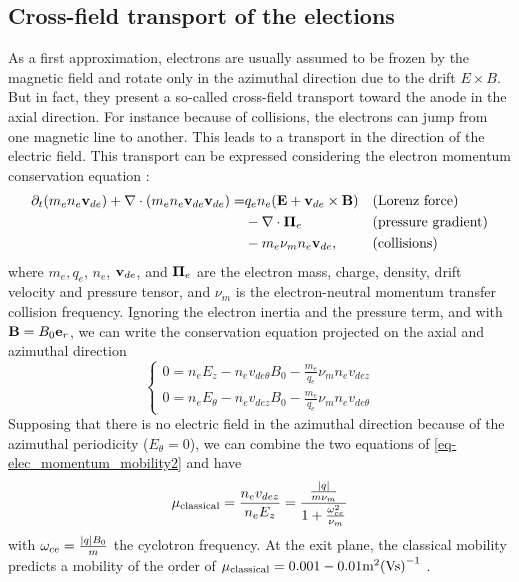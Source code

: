 \subsection*{Cross-field transport of the elections}
  \label{sec-mob}
  
  As a first approximation, electrons are usually assumed to be frozen by the magnetic field and rotate only in the azimuthal direction due to the drift $E \times B$.
  But in fact, they present a so-called cross-field transport toward the anode in the axial direction.
  For instance because of collisions, the electrons can jump from one magnetic line to another.
  This leads to a transport in the direction of the electric field.
  This transport can be expressed considering the electron momentum conservation equation \citep{lafleur2016a}\string:
  \begin{align*} %
    \partial_t(m_e n_e \vect{v}_{de}) + \div(m_e n_e  \vect{v}_{de} \vect{v}_{de})  = & q_e n_e ( \vect{E} + \vect{v}_{de} \times \vect{B})  &&\text{(Lorenz force)}\\ &- \div \vect{\Pi}_e &&\text{(pressure gradient)}\\ & - m_e \nu_m n_e \vect{v}_{de}, &&\text{(collisions)}
  \end{align*}
  where $m_e, q_e$, $n_e$, ${\mathbf v}_{de}$, and ${\mathbf \Pi}_e $ are the electron mass, charge, density, drift velocity and pressure tensor, and $\nu_m$ is the electron-neutral momentum transfer collision frequency.
  Ignoring the electron inertia and the pressure term, and with ${\mathbf B} = B_0 {\mathbf e}_r$, we can write the conservation equation projected on the axial and azimuthal direction
  \begin{equation} \label{eq-elec_momentum_mobility2}
  \begin{cases}
    0 =  n_e E_z - n_e v_{de{\theta}} B_0 - \frac{m_e}{q_e} \nu_m n_e v_{dez}\\
    0 =  n_e E_{\theta} -  n_e v_{dez} B_0 - \frac{m_e}{q_e} \nu_m n_e v_{de{\theta}}
  \end{cases}
  \end{equation}
  Supposing that there is no electric field in the azimuthal direction because of the azimuthal periodicity ($E_{\theta}=0$),  we can combine the two equations of \cref{eq-elec_momentum_mobility2} and have \citep{chen2006,meezan2001}
  \begin{equation} \label{eq-mobility}
    \mu_{\mathrm{classical}} = \frac{n_e v_{dez}}{n_e E_z} = \frac{ \frac{\lvert q\rvert}{m \nu_m}}{1 + \frac{\omega_{ce}^2}{\nu_m}}
  \end{equation}
  with $\omega_{ce}= \frac{\lvert q\rvert B_0}{m}$ the cyclotron frequency.
  At the exit plane, the classical mobility predicts a mobility of the order of $\mu_{\mathrm{classical}}=0.001-0.01 \text{m}^2\text{(Vs)}^{-1}$ \citep{adam2008a}.
    
